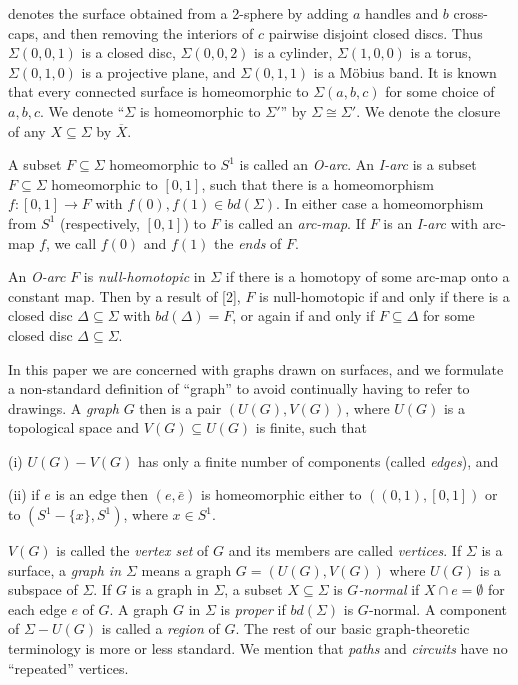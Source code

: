 \noindent denotes the surface obtained from a 2-sphere by adding $a$ handles and $b$ cross-caps, and then removing the interiors of $c$ pairwise disjoint closed discs. Thus $\Sigma(0, 0, 1)$ is a closed disc, $\Sigma(0, 0, 2)$ is a cylinder, $\Sigma(1, 0, 0)$ is a torus, $\Sigma(0, 1, 0)$ is a projective plane, and $\Sigma(0, 1, 1)$ is a M\"obius band. It is known that every connected surface is homeomorphic to $\Sigma(a, b, c)$ for some choice of $a, b, c$. We denote ``$\Sigma$ is homeomorphic to $\Sigma'$'' by $\Sigma \cong \Sigma'$. We denote the closure of any $X \subseteq \Sigma$ by $\overline{X}$.

A subset $F \subseteq \Sigma$ homeomorphic to $S^1$ is called an \textit{O-arc}. An \textit{I-arc} is a subset $F \subseteq \Sigma$ homeomorphic to $[0, 1]$, such that there is a homeomorphism $f \colon [0, 1] \to F$ with $f(0), f(1) \in bd(\Sigma)$. In either case a homeomorphism from $S^1$ (respectively, $[0, 1]$) to $F$ is called an \textit{arc-map}. If $F$ is an \textit{I-arc} with arc-map $f$, we call $f(0)$ and $f(1)$ the \textit{ends} of $F$.

An \textit{O-arc} $F$ is \textit{null-homotopic} in $\Sigma$ if there is a homotopy of some arc-map onto a constant map. Then by a result of [2], $F$ is null-homotopic if and only if there is a closed disc $\Delta \subseteq \Sigma$ with $bd(\Delta) = F$, or again if and only if $F \subseteq \Delta$ for some closed disc $\Delta \subseteq \Sigma$.

In this paper we are concerned with graphs drawn on surfaces, and we formulate a non-standard definition of ``graph'' to avoid continually having to refer to drawings. A \textit{graph} $G$ then is a pair $(U(G), V(G))$, where $U(G)$ is a topological space and $V(G) \subseteq U(G)$ is finite, such that

\hspace*{12pt}(i) $U(G) - V(G)$ has only a finite number of components (called \textit{edges}), and

\hspace*{12pt}(ii) if $e$ is an edge then $(e, \bar{e})$ is homeomorphic either to $((0, 1), [0, 1])$ or to $(S^1 - \{x\}, S^1)$, where $x \in S^1$.

$V(G)$ is called the \textit{vertex set} of $G$ and its members are called \textit{vertices}. If $\Sigma$ is a surface, a \textit{graph in $\Sigma$} means a graph $G = (U(G), V(G))$ where $U(G)$ is a subspace of $\Sigma$. If $G$ is a graph in $\Sigma$, a subset $X \subseteq \Sigma$ is \textit{$G$-normal} if $X \cap e = \emptyset$ for each edge $e$ of $G$. A graph $G$ in $\Sigma$ is \textit{proper} if $bd(\Sigma)$ is $G$-normal. A component of $\Sigma - U(G)$ is called a \textit{region} of $G$. The rest of our basic graph-theoretic terminology is more or less standard. We mention that \textit{paths} and \textit{circuits} have no ``repeated'' vertices.


